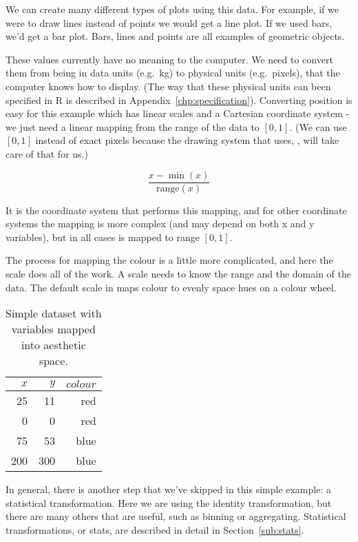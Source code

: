 We can create many different types of plots using this data.  For example, if we were to draw lines instead of points we would get a line plot.  If we used bars, we'd get a bar plot.  Bars, lines and points are all examples of geometric objects.  

These values currently have no meaning to the computer.  We need to convert them from being in data units (e.g.\ kg) to physical units (e.g.\ pixels), that the computer knows how to display.  (The way that these physical units can been specified in R is described in Appendix~\ref{chp:specification}). Converting position is easy for this example which has linear scales and a Cartesian coordinate system - we just need a linear mapping from the range of the data to $[0, 1]$.  (We can use $[0, 1]$ instead of exact pixels because the drawing system that \ggplot uses, , will take care of that for us.)

\[ \frac{x - \min(x)}{\mbox{range}(x)}  \] 

It is the coordinate system that performs this mapping, and for other coordinate systems the mapping is more complex (and may depend on both x and y variables), but in all cases is mapped to range $[0, 1]$.

The process for mapping the colour is a little more complicated, and here the scale does all of the work.  A scale needs to know the range and the domain of the data.  The default scale in \ggplot maps colour to evenly space hues on a colour wheel.


\begin{table}[ht]
	\begin{center}
	\begin{tabular}{r|r|r}
		$x$ & $y$ & $colour$\\
		\hline
		25 & 11 & red\\
		0 & 0 & red \\
		75  & 53 & blue \\
		200 & 300 & blue
	\end{tabular}
	\end{center}
	\caption{Simple dataset with variables mapped into aesthetic space.}
	\label{tbl:scaled}
\end{table}

In general, there is another step that we've skipped in this simple example: a statistical transformation.  Here we are using the identity transformation, but there are many others that are useful, such as binning or aggregating.  Statistical transformations, or stats, are described in detail in Section~\ref{sub:stats}.

